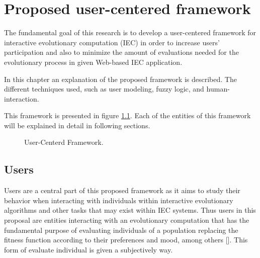 \chapter{Proposed user-centered framework}

The fundamental goal of this research is to develop a user-centered framework
for interactive evolutionary computation (IEC) in order to increase users’
participation and also to minimize the amount of evaluations needed for the
evolutionary process in given Web-based IEC application.

In this chapter an explanation of the proposed framework is described. The
different techniques used, such as user modeling, fuzzy logic, and human-
interaction.

This framework is presented in figure \ref{fig:uc_framework}. Each of the
entities of this framework will be explained in detail in following sections.

\begin{figure}
	\captionsetup{justification=centering,margin=2cm}
	\centering
	\setlength\fboxsep{0pt}
	\setlength\fboxrule{0.7pt}
	\caption{User-Centerd Framework.}
	\label{fig:uc_framework}       
\end{figure}

\section{Users} 

Users are a central part of this proposed framework as it aims to study their
behavior when interacting with individuals within interactive evolutionary
algorithms and other tasks that may exist within IEC systems. Thus users in
this proposal are entities interacting with an evolutionary computation that
has the fundamental purpose of evaluating individuals of a population
replacing the fitness function according to their preferences and mood, among
others []. This form of evaluate individual is given a subjectively way.

